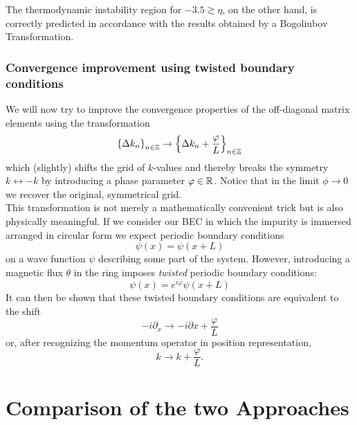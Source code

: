 The thermodynamic instability region for $-3.5\gtrsim\eta$, on the other hand, is correctly predicted in accordance with the results obtained by a Bogoliubov Transformation.
\subsubsection{Convergence improvement using twisted boundary conditions}
We will now try to improve the convergence properties of the off-diagonal matrix elements using the transformation
\begin{equation} \label{twisted_trafo}
\left\{\Delta k_n\right\}_{n\in\mathbb{Z}}\rightarrow \left\{\Delta k_n+\frac{\varphi}{L}\right\}_{n\in\mathbb{Z}}
\end{equation}
 which (slightly) shifts the grid of $k$-values and thereby breaks the symmetry $k\leftrightarrow -k$ by introducing a phase parameter $\varphi\in\mathbb{R}$. Notice that in the limit $\phi\rightarrow 0$ we recover the original, symmetrical grid. \\
This transformation is not merely a mathematically convenient trick but is also physically meaningful. If we consider our BEC in which the impurity is immersed arranged in circular form we expect periodic boundary conditions
\begin{equation}
\psi(x)=\psi(x+L)
\end{equation}
on a wave function $\psi$ describing some part of the system. However, introducing a magnetic flux $\theta$ in the ring imposes \emph{twisted} periodic boundary conditions:
\begin{equation}
\psi(x)=e^{i\varphi}\psi(x+L)
\end{equation}
It can then be shown \cite{twisted} that these twisted boundary conditions are equivalent to the shift 
\begin{equation}
-i\partial_x\rightarrow -i\partial x+\frac{\varphi}{L}
\end{equation}
or, after recognizing the momentum operator in position representation, 
\begin{equation}
k\rightarrow k+\frac{\varphi}{L}.
\end{equation}
\section{Comparison of the two Approaches}

